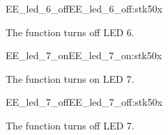 \begin{function_nopb2}{EE\_led\_6\_off}{EE_led_6_off:stk50x}
  
  \begin{fundescription}
    The function turns off LED 6.
  \end{fundescription}
  
  
  
\end{function_nopb2}

\begin{function_nopb2}{EE\_led\_7\_on}{EE_led_7_on:stk50x}
  
  \begin{fundescription}
    The function turns on LED 7.
  \end{fundescription}
  
  
  
\end{function_nopb2}

\begin{function_nopb2}{EE\_led\_7\_off}{EE_led_7_off:stk50x}
  
  \begin{fundescription}
    The function turns off LED 7.
  \end{fundescription}
  
  
  
\end{function_nopb2}

